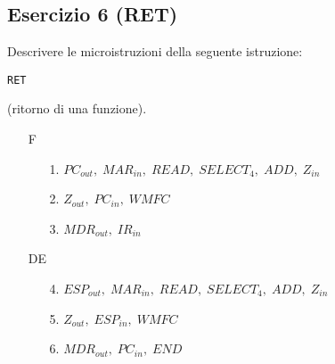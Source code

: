 \documentclass[a4paper]{article}
\theoremstyle{break}
\theoremstyle{break}
\theoremstyle{break}
\theoremstyle{break}
\begin{document}
\subsection{Esercizio 6 (RET)}
\begin{exercise}
  Descrivere le microistruzioni della seguente istruzione:
  \begin{center}
    \texttt{RET}
  \end{center}
  (ritorno di una funzione).

  \begin{enumerate}
    \item [F]
      \begin{enumerate}
        \item [1.] \( PC_{out},\; MAR_{in},\; READ,\; SELECT_4,\; ADD,\; Z_{in} \) 
        \item [2.] \( Z_{out},\; PC_{in},\; WMFC \) 
        \item [3.] \( MDR_{out},\; IR_{in} \) 
      \end{enumerate}
    \item [DE]
      \begin{enumerate}
        \item [4.] \( ESP_{out},\; MAR_{in},\; READ,\; SELECT_4,\; ADD,\; Z_{in} \) 
        \item [5.] \( Z_{out},\; ESP_{in},\; WMFC \) 
        \item [6.] \( MDR_{out},\; PC_{in},\; END \) 
      \end{enumerate}
  \end{enumerate}
\end{exercise}
\end{document}
